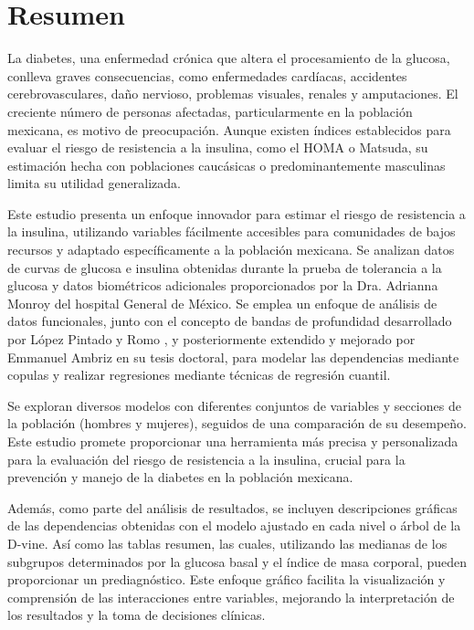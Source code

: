 \chapter*{Resumen}

La diabetes, una enfermedad crónica que altera el procesamiento de la glucosa, conlleva graves consecuencias, como enfermedades cardíacas, accidentes cerebrovasculares, daño nervioso, problemas visuales, renales y amputaciones. El creciente número de personas afectadas, particularmente en la población mexicana, es motivo de preocupación. Aunque existen índices establecidos para evaluar el riesgo de resistencia a la insulina, como el HOMA o Matsuda, su estimación hecha con poblaciones caucásicas o predominantemente masculinas limita su utilidad generalizada.

Este estudio presenta un enfoque innovador para estimar el riesgo de resistencia a la insulina, utilizando variables fácilmente accesibles para comunidades de bajos recursos y adaptado específicamente a la población mexicana. Se analizan datos de curvas de glucosa e insulina obtenidas durante la prueba de tolerancia a la glucosa y datos biométricos adicionales proporcionados por la Dra. Adrianna Monroy del hospital General de México. Se emplea un enfoque de análisis de datos funcionales, junto con el concepto de bandas de profundidad desarrollado por López Pintado y Romo \cite{boxplotFun}, y posteriormente extendido y mejorado por Emmanuel Ambriz en su tesis doctoral, para modelar las dependencias mediante copulas y realizar regresiones mediante técnicas de regresión cuantil.

Se exploran diversos modelos con diferentes conjuntos de variables y secciones de la población (hombres y mujeres), seguidos de una comparación de su desempeño. Este estudio promete proporcionar una herramienta más precisa y personalizada para la evaluación del riesgo de resistencia a la insulina, crucial para la prevención y manejo de la diabetes en la población mexicana. 

Además, como parte del análisis de resultados, se incluyen descripciones gráficas de las dependencias obtenidas con el modelo ajustado en cada nivel o árbol de la D-vine. Así como las tablas resumen, las cuales, utilizando las medianas de los subgrupos determinados por la glucosa basal y el índice de masa corporal, pueden proporcionar un prediagnóstico. Este enfoque gráfico facilita la visualización y comprensión de las interacciones entre variables, mejorando la interpretación de los resultados y la toma de decisiones clínicas.






